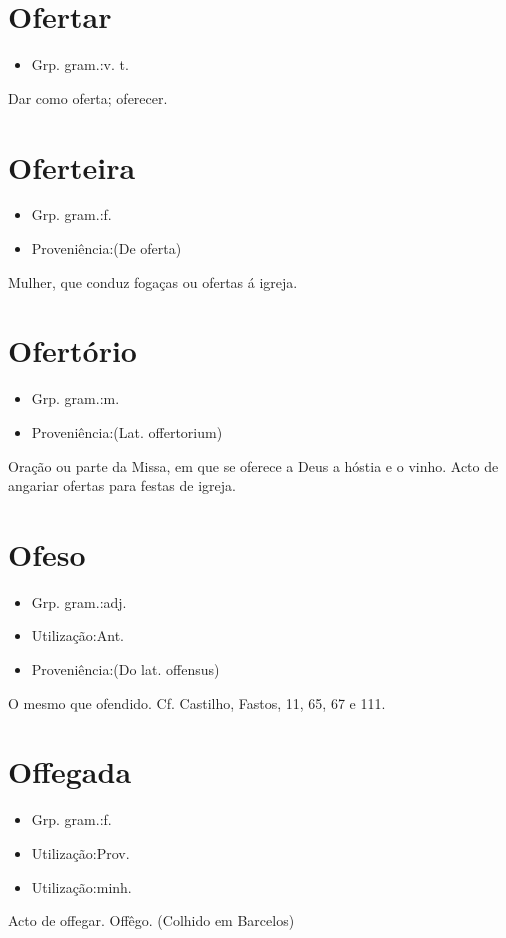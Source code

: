 \section{Ofertar}
\begin{itemize}
\item {Grp. gram.:v. t.}
\end{itemize}
Dar como oferta; oferecer.
\section{Oferteira}
\begin{itemize}
\item {Grp. gram.:f.}
\end{itemize}
\begin{itemize}
\item {Proveniência:(De \textunderscore oferta\textunderscore )}
\end{itemize}
Mulher, que conduz fogaças ou ofertas á igreja.
\section{Ofertório}
\begin{itemize}
\item {Grp. gram.:m.}
\end{itemize}
\begin{itemize}
\item {Proveniência:(Lat. \textunderscore offertorium\textunderscore )}
\end{itemize}
Oração ou parte da Missa, em que se oferece a Deus a hóstia e o vinho.
Acto de angariar ofertas para festas de igreja.
\section{Ofeso}
\begin{itemize}
\item {Grp. gram.:adj.}
\end{itemize}
\begin{itemize}
\item {Utilização:Ant.}
\end{itemize}
\begin{itemize}
\item {Proveniência:(Do lat. \textunderscore offensus\textunderscore )}
\end{itemize}
O mesmo que \textunderscore ofendido\textunderscore . Cf. Castilho, \textunderscore Fastos\textunderscore , 11, 65, 67 e 111.
\section{Offegada}
\begin{itemize}
\item {Grp. gram.:f.}
\end{itemize}
\begin{itemize}
\item {Utilização:Prov.}
\end{itemize}
\begin{itemize}
\item {Utilização:minh.}
\end{itemize}
Acto de offegar.
Offêgo.
(Colhido em Barcelos)
